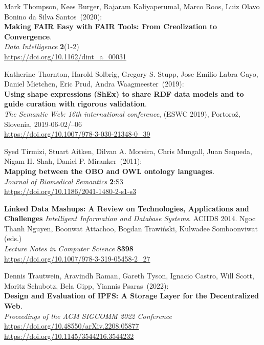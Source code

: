 \begin{thebibliography}{9}
Mark Thompson, Kees Burger, Rajaram Kaliyaperumal, Marco Roos, Luiz Olavo Bonino da Silva Santos~(2020): \\
\textbf{Making FAIR Easy with FAIR Tools: From Creolization to Convergence}.\\
\emph{Data Intelligence} \textbf{2}(1-2)\\
\url{https://doi.org/10.1162/dint_a_00031}

Katherine Thornton, Harold Solbrig, Gregory S. Stupp, Jose Emilio Labra
Gayo, Daniel Mietchen, Eric Prud, Andra Waagmeester~(2019): \\
\textbf{Using shape expressions ({ShEx}) to share {RDF} data models and
to guide curation with rigorous validation}. \\
\emph{The Semantic Web: 16th international conference}, (ESWC 2019), Portorož, Slovenia,
2019-06-02/--06\\
\url{https://doi.org/10.1007/978-3-030-21348-0_39}


Syed Tirmizi, Stuart Aitken, Dilvan A. Moreira, Chris Mungall, Juan
Sequeda, Nigam H. Shah, Daniel P. Miranker~(2011): \\
\textbf{Mapping between the {OBO} and {OWL} ontology languages}. \\
\emph{Journal of Biomedical Semantics} \textbf{2}:S3 \\
\url{https://doi.org/10.1186/2041-1480-2-s1-s3}

\textbf{Linked Data Mashups: A Review on Technologies, Applications and Challenges}
\emph{Intelligent Information and Database Systems}. ACIIDS 2014. Ngoc Thanh Nguyen, Boonwat Attachoo, Bogdan Trawiński, Kulwadee Somboonviwat (eds.)\\
\emph{Lecture Notes in Computer Science} \textbf{8398}\\
\url{https://doi.org/10.1007/978-3-319-05458-2_27}

Dennis Trautwein, Aravindh Raman, Gareth Tyson, Ignacio Castro, Will Scott, Moritz Schubotz, Bela Gipp, Yiannis Psaras~(2022): \\
\textbf{Design and Evaluation of IPFS: A Storage Layer for the Decentralized Web}.\\
\emph{Proceedings of the {ACM} {SIGCOMM} 2022 Conference}\\
\url{https://doi.org/10.48550/arXiv.2208.05877}\\
\url{https://doi.org/10.1145/3544216.3544232}


\end{thebibliography}
